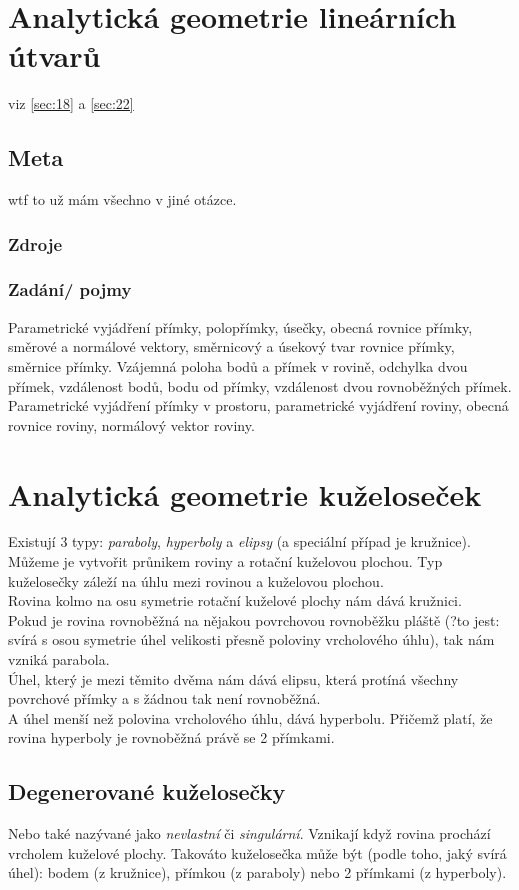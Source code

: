\documentclass[12pt]{article}
\begin{document}
\section{Analytická geometrie lineárních útvarů}
viz \ref{sec:18} a \ref{sec:22}
\subsection{Meta}
wtf to už mám všechno v jiné otázce.
\subsubsection{Zdroje}
\subsubsection{Zadání/ pojmy}
Parametrické vyjádření přímky, polopřímky, úsečky, obecná rovnice přímky, směrové a normálové vektory, směrnicový a úsekový tvar rovnice přímky, směrnice přímky. Vzájemná poloha bodů a přímek v rovině, odchylka dvou přímek, vzdálenost bodů, bodu od přímky, vzdálenost dvou rovnoběžných přímek. Parametrické vyjádření přímky v prostoru, parametrické vyjádření roviny, obecná rovnice roviny, normálový vektor roviny.

\section{Analytická geometrie kuželoseček}
\label{sec:kuzelosecky}
Existují 3 typy: \emph{paraboly}, \emph{hyperboly} a \emph{elipsy} (a speciální případ je kružnice). Můžeme je vytvořit průnikem roviny a rotační kuželovou plochou. Typ kuželosečky záleží na úhlu mezi rovinou a kuželovou plochou.\\
Rovina kolmo na osu symetrie rotační kuželové plochy nám dává kružnici.\\Pokud je rovina rovnoběžná na nějakou povrchovou rovnoběžku pláště (?to jest: svírá s osou symetrie úhel velikosti přesně poloviny vrcholového úhlu), tak nám vzniká parabola.\\
Úhel, který je mezi těmito dvěma nám dává elipsu, která protíná všechny povrchové přímky a s žádnou tak není rovnoběžná.\\
A úhel menší než polovina vrcholového úhlu, dává hyperbolu. Přičemž platí, že rovina hyperboly je rovnoběžná právě se 2 přímkami.
\subsection{Degenerované kuželosečky}
Nebo také nazývané jako \emph{nevlastní} či \emph{singulární}. Vznikají když rovina prochází vrcholem kuželové plochy. Takováto kuželosečka může být  (podle toho, jaký svírá úhel): bodem (z kružnice), přímkou (z paraboly) nebo 2 přímkami (z hyperboly).
\end{document}
